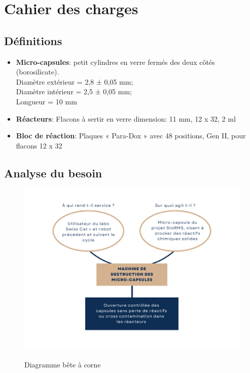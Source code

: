 \section{Cahier des charges}

\subsection{Définitions}

\begin{itemize}[label=\textbullet]
    \item \textbf{Micro-capsules}: petit cylindres en verre fermés des deux côtés (borosilicate). \\ 
    Diamètre extérieur = 2,8 ± 0,05 mm; \\
    Diamètre intérieur = 2,5 ± 0,05 mm; \\
    Longueur = 10 mm

    \item \textbf{Réacteurs}: Flacons à sertir en verre dimension: 11 mm, 12 x 32, 2 ml 
    
    \item \textbf{Bloc de réaction}: Plaques « Para-Dox » avec 48 positions, Gen II, pour flacons 12 x 32
\end{itemize}

\subsection{Analyse du besoin}

\begin{figure}[H]
    \centering
    \includegraphics[width=15cm]{Images/Illustrations/CDH/Bete a corne.png}
    \label{fig:beteacorne}
    \caption{Diagramme bête à corne}
\end{figure}

